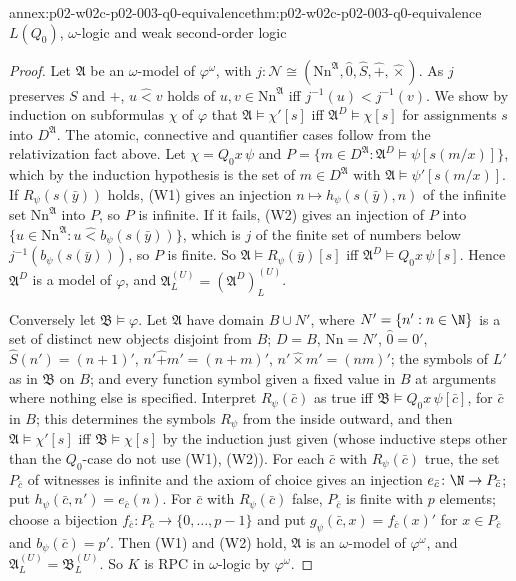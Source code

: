 \begin{annexitem}{annex:p02-w02c-p02-003-q0-equivalence}{thm:p02-w02c-p02-003-q0-equivalence}{\(L(Q_0)\), \(\omega\)-logic and weak second-order logic}
\begin{proof}
Let \(\mathfrak A\) be an \(\omega\)-model of \(\varphi^{\omega}\), with
\(j\colon\mathcal N\cong(\mathrm{Nn}^{\mathfrak A},\hat0,\hat S,\hat+,
\hat\times)\).  As \(j\) preserves \(S\) and \(+\),
\(u\mathbin{\hat<}v\) holds of \(u,v\in\mathrm{Nn}^{\mathfrak A}\) iff
\(j^{-1}(u)<j^{-1}(v)\).  We show by induction on subformulas \(\chi\) of
\(\varphi\) that \(\mathfrak A\models\chi'[s]\) iff
\(\mathfrak A^{D}\models\chi[s]\) for assignments \(s\) into
\(D^{\mathfrak A}\).  The atomic, connective and quantifier cases follow from
the relativization fact above.  Let \(\chi=Q_0x\,\psi\) and
\(P=\{m\in D^{\mathfrak A}:\mathfrak A^{D}\models\psi[s(m/x)]\}\), which by
the induction hypothesis is the set of \(m\in D^{\mathfrak A}\) with
\(\mathfrak A\models\psi'[s(m/x)]\).  If \(R_\psi(s(\bar y))\) holds,
(W1) gives an injection \(n\mapsto h_\psi(s(\bar y),n)\) of the infinite set
\(\mathrm{Nn}^{\mathfrak A}\) into \(P\), so \(P\) is infinite.  If it fails,
(W2) gives an injection of \(P\) into
\(\{u\in\mathrm{Nn}^{\mathfrak A}:u\mathbin{\hat<}b_\psi(s(\bar y))\}\),
which is \(j\) of the finite set of numbers below \(j^{-1}(b_\psi(s(\bar y)))\),
so \(P\) is finite.  So \(\mathfrak A\models R_\psi(\bar y)[s]\) iff
\(\mathfrak A^{D}\models Q_0x\,\psi[s]\).  Hence \(\mathfrak A^{D}\) is a model
of \(\varphi\), and \(\mathfrak A^{(U)}_{L}=(\mathfrak A^{D})^{(U)}_{L}\).

Conversely let \(\mathfrak B\models\varphi\).  Let \(\mathfrak A\) have
domain \(B\cup N'\), where \(N'=\{n':n\in\N\}\) is a set of distinct new
objects disjoint from \(B\); \(D=B\), \(\mathrm{Nn}=N'\), \(\hat0=0'\),
\(\hat S(n')=(n+1)'\), \(n'\mathbin{\hat+}m'=(n+m)'\), \(n'\mathbin{\hat\times}
m'=(nm)'\); the symbols of \(L'\) as in \(\mathfrak B\) on \(B\); and every
function symbol given a fixed value in \(B\) at arguments where nothing else
is specified.  Interpret \(R_\psi(\bar c)\) as true iff
\(\mathfrak B\models Q_0x\,\psi[\bar c]\), for \(\bar c\) in \(B\); this
determines the symbols \(R_\psi\) from the inside outward, and then
\(\mathfrak A\models\chi'[s]\) iff \(\mathfrak B\models\chi[s]\) by the
induction just given (whose inductive steps other than the \(Q_0\)-case do
not use (W1), (W2)).  For each \(\bar c\) with \(R_\psi(\bar c)\) true,
the set \(P_{\bar c}\) of witnesses is infinite and the axiom of choice gives
an injection \(e_{\bar c}\colon\N\to P_{\bar c}\); put
\(h_\psi(\bar c,n')=e_{\bar c}(n)\).  For \(\bar c\) with \(R_\psi(\bar c)\)
false, \(P_{\bar c}\) is finite with \(p\) elements; choose a bijection
\(f_{\bar c}\colon P_{\bar c}\to\{0,\ldots,p-1\}\) and put
\(g_\psi(\bar c,x)=f_{\bar c}(x)'\) for \(x\in P_{\bar c}\) and
\(b_\psi(\bar c)=p'\).  Then (W1) and (W2) hold, \(\mathfrak A\) is an
\(\omega\)-model of \(\varphi^{\omega}\), and
\(\mathfrak A^{(U)}_{L}=\mathfrak B^{(U)}_{L}\).  So \(K\) is RPC in
\(\omega\)-logic by \(\varphi^{\omega}\).


\end{proof}
\end{annexitem}
